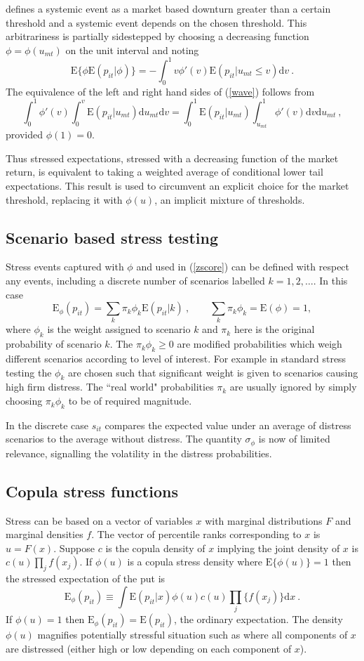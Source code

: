 \documentclass[authoryear]{elsarticle}
\newcommand{\E}{\mathrm{E}}
\newcommand{\Es}{\E_\phi}
\newcommand{\de}{\mathrm{d}}
\newcommand{\eref}[1]{(\ref{#1})}
\newcommand{\cq}{\ , \qquad}
\newcommand{\be}[1]{\begin{equation}\label{#1}}
\newcommand{\ee}{\end{equation}}
\begin{document}
\cite{brownlees2015} defines a systemic event as a market based downturn greater than a certain threshold and a systemic event  depends on the chosen threshold.   This arbitrariness is partially sidestepped by choosing a decreasing function $\phi=\phi(u_{mt})$ on the unit interval and noting
\be{wave}
\E\{\phi\E(p_{it}|\phi)\} = -\int_0^1 v\phi'(v)\E(p_{it}|u_{mt}\le v) \de v \ .
\ee
The equivalence of the left and right hand sides of \eref{wave}  follows from
$$
\int_0^1 \phi'(v)  \int_0^v \E(p_{it}|u_{mt})\de u_{mt}   \de v =\int_0^1\E(p_{it}|u_{mt})\int_{u_{mt}}^1  \phi'(v) \de v \de u_{mt}\ ,
$$
provided $\phi(1)=0$.

Thus stressed expectations, stressed with a decreasing function of the market return, is equivalent to taking a weighted average of conditional lower tail expectations.  This result is used to circumvent an explicit choice for the market threshold, replacing it with  $\phi(u)$, an implicit  mixture of thresholds.

\subsection{Scenario based stress testing}
 Stress events captured with $\phi$ and used  in \eref{zscore}  can be defined with respect any events, including a discrete number of scenarios labelled $k=1,2, \ldots$.   In this case
$$
\Es(p_{it})= \sum_k \pi_k\phi_k\E(p_{it}|k)\cq \sum_k\pi_k\phi_k = \E(\phi) = 1 ,
$$
where $\phi_k$ is the weight assigned to scenario $k$ and $\pi_k$ here is the original probability of scenario $k$.   The $\pi_k\phi_k\ge 0$ are  modified  probabilities which weigh different scenarios according to level of interest.   For example in standard stress testing the $\phi_k$ are chosen such that significant weight is given to scenarios causing high  firm distress.   The ``real world" probabilities $\pi_k$ are  usually ignored by  simply choosing  $\pi_k\phi_k$ to be of  required magnitude.

In the discrete case $s_{it}$ compares the expected value under an average of distress scenarios to the average without distress.  The quantity $\sigma_\phi$ is now of limited relevance, signalling the volatility in the distress probabilities.


\subsection{Copula stress functions}


Stress can be based on a vector of variables $x$ with marginal distributions $F$ and marginal densities $f$. The vector of percentile ranks corresponding to $x$ is $u=F(x)$.  Suppose $c$ is the copula density of $x$ implying the joint density of $x$ is $c(u)\prod_jf(x_j)$.    If   $\phi(u)$ is a copula stress density where $\E\{\phi(u)\}=1$ then the stressed expectation of the put is
\be{copula}
\Es(p_{it}) \equiv \int \E(p_{it}|x)\phi(u)c(u)\prod_j\{f(x_j)\}  \de x   \ .
\ee
If $\phi(u)=1$  then $\Es(p_{it})=\E(p_{it})$, the ordinary expectation.   The density $\phi(u)$ magnifies potentially stressful situation such as where all components of $x$ are distressed (either high or low depending on each component of $x$).
\end{document}
